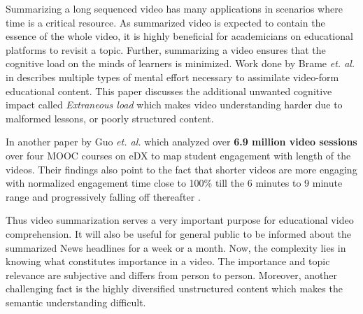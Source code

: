 	Summarizing a long sequenced video has many applications in scenarios where time is a critical resource. As summarized video is expected to contain the essence of the whole video, it is highly beneficial for academicians on educational platforms to revisit a topic. Further, summarizing a video ensures that the cognitive load on the minds of learners is minimized. Work done by Brame \textit{et. al.} in \cite{brame2015effective} describes multiple types of mental effort necessary to assimilate video-form educational content. This paper discusses the additional unwanted cognitive impact called \textit{Extraneous load} which makes video understanding harder due to malformed lessons, or poorly structured content. 
	
	In another paper by Guo \textit{et. al.} which analyzed over \textbf{6.9 million video sessions} over four MOOC courses on eDX to map student engagement with length of the videos. Their findings also point to the fact that shorter videos are more engaging with normalized engagement time close to 100\% till the 6 minutes to 9 minute range and progressively falling off thereafter \cite{guo2014video}.

	
	Thus video summarization serves a very important purpose for educational video comprehension. It will also be useful for general public to be informed about the summarized News headlines for a week or a month. Now, the complexity lies in knowing what constitutes importance in a video. The importance and topic relevance are subjective and differs from person to person. Moreover, another challenging fact is the highly diversified unstructured content which makes the semantic understanding difficult.